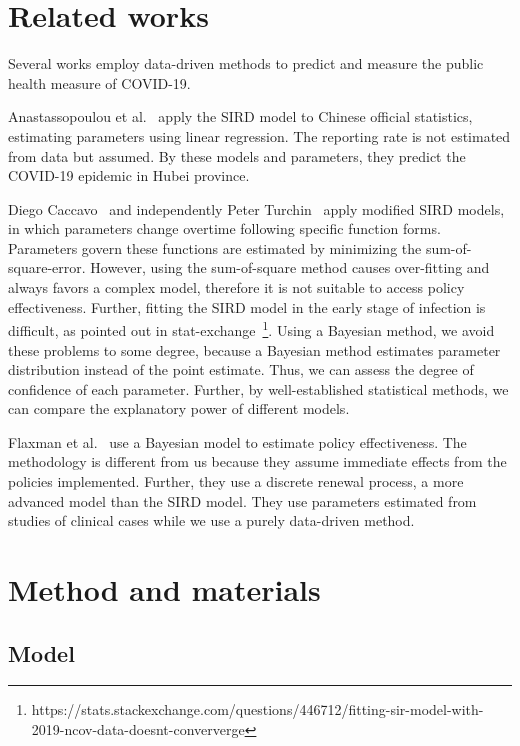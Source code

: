\documentclass{amsart}
\begin{document}
\section{Related works}

Several works employ data-driven methods to predict and measure the public health measure of COVID-19.

Anastassopoulou et al.~\cite{Anastassopoulou2020} apply the SIRD model to Chinese official statistics, estimating parameters using linear regression.
The reporting rate is not estimated from data but assumed.
By these models and parameters, they predict the COVID-19 epidemic in Hubei province.

Diego Caccavo~\cite{Caccavo2020} and independently Peter Turchin~\cite{Turchin2020} apply modified SIRD models, in which parameters change overtime following specific function forms.
Parameters govern these functions are estimated by minimizing the sum-of-square-error.
However, using the sum-of-square method causes over-fitting and always favors a complex model, therefore it is not suitable to access policy effectiveness.
Further, fitting the SIRD model in the early stage of infection is difficult, as pointed out in stat-exchange~\footnote{https://stats.stackexchange.com/questions/446712/fitting-sir-model-with-2019-ncov-data-doesnt-conververge}.
Using a Bayesian method, we avoid these problems to some degree, because a Bayesian method estimates parameter distribution instead of the point estimate.
Thus, we can assess the degree of confidence of each parameter.
Further, by well-established statistical methods, we can compare the explanatory power of different models.

Flaxman et al.~\cite{Flaxman2020} use a Bayesian model to estimate policy effectiveness.
The methodology is different from us because they assume immediate effects from the policies implemented.
Further, they use a discrete renewal process, a more advanced model than the SIRD model.
They use parameters estimated from studies of clinical cases while we use a purely data-driven method.

\section{Method and materials}

\subsection{Model}
\end{document}
